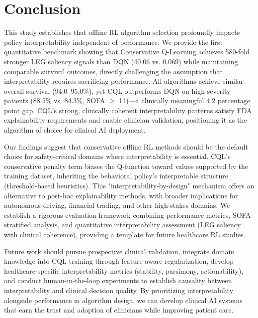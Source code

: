 
\section{Conclusion}\label{sec:conclusion}

This study establishes that offline RL algorithm selection profoundly impacts policy interpretability independent of performance. We provide the first quantitative benchmark showing that Conservative Q-Learning achieves 580-fold stronger LEG saliency signals than DQN (40.06 vs. 0.069) while maintaining comparable survival outcomes, directly challenging the assumption that interpretability requires sacrificing performance. All algorithms achieve similar overall survival (94.0--95.0\%), yet CQL outperforms DQN on high-severity patients (88.5\% vs. 84.3\%, SOFA $\geq$ 11)—a clinically meaningful 4.2 percentage point gap. CQL's strong, clinically coherent interpretability patterns satisfy FDA explainability requirements and enable clinician validation, positioning it as the algorithm of choice for clinical AI deployment.

Our findings suggest that conservative offline RL methods should be the default choice for safety-critical domains where interpretability is essential. CQL's conservative penalty term biases the Q-function toward values supported by the training dataset, inheriting the behavioral policy's interpretable structure (threshold-based heuristics). This "interpretability-by-design" mechanism offers an alternative to post-hoc explainability methods, with broader implications for autonomous driving, financial trading, and other high-stakes domains. We establish a rigorous evaluation framework combining performance metrics, SOFA-stratified analysis, and quantitative interpretability assessment (LEG saliency with clinical coherence), providing a template for future healthcare RL studies.

Future work should pursue prospective clinical validation, integrate domain knowledge into CQL training through feature-aware regularization, develop healthcare-specific interpretability metrics (stability, parsimony, actionability), and conduct human-in-the-loop experiments to establish causality between interpretability and clinical decision quality. By prioritizing interpretability alongside performance in algorithm design, we can develop clinical AI systems that earn the trust and adoption of clinicians while improving patient care.

